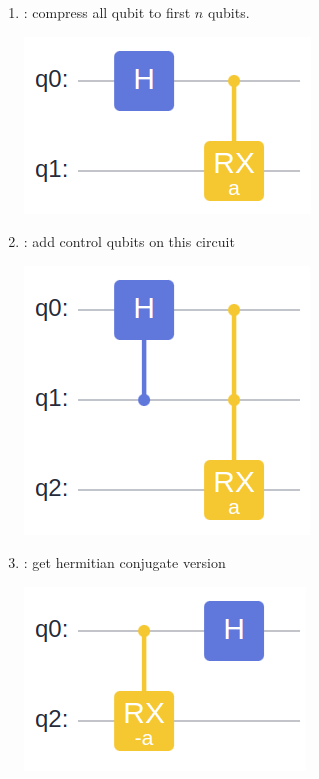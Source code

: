 \begin{enumerate}
    \item {} : compress all qubit to first $n$ qubits.\par
          \begin{minipage}{\linewidth}
              \centering
              \includegraphics[width=0.6\linewidth]{images/2_4_compress_circ.png}
          \end{minipage}
    \item {} : add control qubits on this circuit\par
          \begin{minipage}{\linewidth}
              \centering
              \includegraphics[width=0.6\linewidth]{images/2_4_ctrl_circ.png}
          \end{minipage}
    \item {} : get hermitian conjugate version\par
          \begin{minipage}{\linewidth}
              \centering
              \includegraphics[width=0.6\linewidth]{images/2_4_dagger_circ.png}

\end{minipage}
\end{enumerate}
